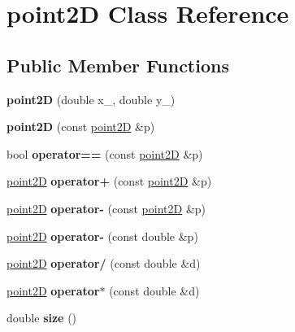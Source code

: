 \hypertarget{classpoint2D}{}\section{point2D Class Reference}
\label{classpoint2D}
\subsection*{Public Member Functions}
\begin{DoxyCompactItemize}
\item 
\mbox{\label{classpoint2D_ad3c713839ca9768e41c295b2e6e5afa7}} 
{\bfseries point2D} (double x\+\_\+, double y\+\_\+)
\item 
\mbox{\label{classpoint2D_ab5af14144bffe77818139d21003b58bb}} 
{\bfseries point2D} (const \mbox{\hyperlink{classpoint2D}{point2D}} \&p)
\item 
\mbox{\label{classpoint2D_a34b676d196277da05f03e87dc2f88288}} 
bool {\bfseries operator==} (const \mbox{\hyperlink{classpoint2D}{point2D}} \&p)
\item 
\mbox{\label{classpoint2D_a76074a1176a4618c53d3f043bfdf6c63}} 
\mbox{\hyperlink{classpoint2D}{point2D}} {\bfseries operator+} (const \mbox{\hyperlink{classpoint2D}{point2D}} \&p)
\item 
\mbox{\label{classpoint2D_a09800bd3d11ba62ff77016c8d120dad6}} 
\mbox{\hyperlink{classpoint2D}{point2D}} {\bfseries operator-\/} (const \mbox{\hyperlink{classpoint2D}{point2D}} \&p)
\item 
\mbox{\label{classpoint2D_ae82aa8f1fb54ea829b5d96bf0abe2ee4}} 
\mbox{\hyperlink{classpoint2D}{point2D}} {\bfseries operator-\/} (const double \&p)
\item 
\mbox{\label{classpoint2D_aa083eccf18a944e03f097ec386d90f41}} 
\mbox{\hyperlink{classpoint2D}{point2D}} {\bfseries operator/} (const double \&d)
\item 
\mbox{\label{classpoint2D_a99f2c435a66f29b578cfbe038e3b0a4f}} 
\mbox{\hyperlink{classpoint2D}{point2D}} {\bfseries operator$\ast$} (const double \&d)
\item 
\mbox{\label{classpoint2D_ae51e5cac280000178e5e1f195a0d261e}} 
double {\bfseries size} ()
\end{DoxyCompactItemize}
